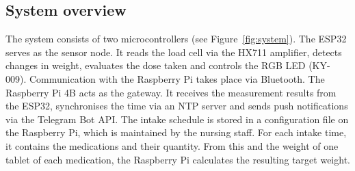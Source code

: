 \subsection{System overview}

The system consists of two microcontrollers (see
Figure~\ref{fig:system}). The ESP32 serves as the sensor node. It reads the
load cell via the HX711 amplifier, detects changes in weight, evaluates the
dose taken and controls the RGB LED (KY-009). Communication with the Raspberry
Pi takes place via Bluetooth. The Raspberry Pi 4B acts as the gateway. It
receives the measurement results from the ESP32, synchronises the time via an
NTP server and sends push notifications via the Telegram Bot API. The intake
schedule is stored in a configuration file on the Raspberry Pi, which is
maintained by the nursing staff. For each intake time, it contains the
medications and their quantity. From this and the weight of one tablet of each
medication, the Raspberry Pi calculates the resulting target weight.
